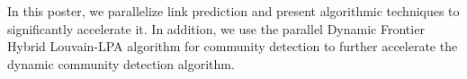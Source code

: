 In this poster, we parallelize link prediction and present algorithmic techniques to significantly accelerate it. In addition, we use the parallel Dynamic Frontier Hybrid Louvain-LPA algorithm for community detection to further accelerate the dynamic community detection algorithm.










